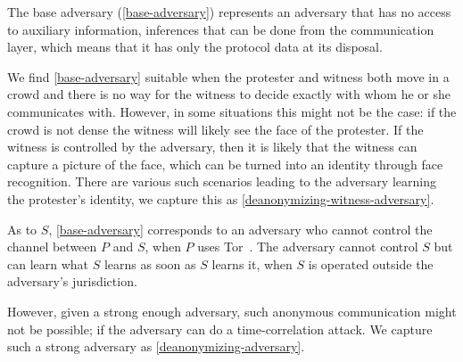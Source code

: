 The base adversary (\cref{base-adversary}) represents an adversary that has no 
access to auxiliary information, \eg inferences that can be done from the 
communication layer, which means that it has only the protocol data at its 
disposal.

We find \cref{base-adversary} suitable when the protester and witness both move 
in a crowd and there is no way for the witness to decide exactly with whom he 
or she communicates with.
However, in some situations this might not be the case: \Eg if the crowd is not 
dense the witness will likely see the face of the protester.
If the witness is controlled by the adversary, then it is likely that the 
witness can capture a picture of the face, which can be turned into an identity 
through face recognition.
There are various such scenarios leading to the adversary learning the 
protester's identity, we capture this as 
\cref{deanonymizing-witness-adversary}.

As to \(S\), \cref{base-adversary} corresponds to an adversary who cannot 
control the channel between \(P\) and \(S\), \eg when \(P\) uses 
Tor~\cite{Tor}.
The adversary cannot control \(S\) but can learn what \(S\) learns as soon as 
\(S\) learns it, \eg when \(S\) is operated outside the adversary's 
jurisdiction.

However, given a strong enough adversary, such anonymous communication might 
not be possible; \eg if the adversary can do a time-correlation attack.
We capture such a strong adversary as \cref{deanonymizing-adversary}.

